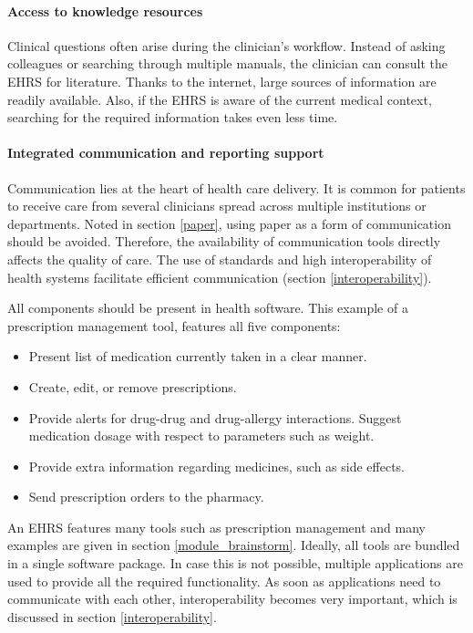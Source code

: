     \paragraph{Access to knowledge resources} Clinical questions often arise during the clinician's workflow. Instead of asking colleagues or searching through multiple manuals, the clinician can consult the EHRS for literature. Thanks to the internet, large sources of information are readily available. Also, if the EHRS is aware of the current medical context, searching for the required information takes even less time. 

    \paragraph{Integrated communication and reporting support} Communication lies at the heart of health care delivery. It is common for patients to receive care from several clinicians spread across multiple institutions or departments. Noted in section \ref{paper}, using paper as a form of communication should be avoided. Therefore, the availability of communication tools directly affects the quality of care. The use of standards and high interoperability of health systems facilitate efficient communication (section \ref{interoperability}).\bigskip %

    \noindent All components should be present in health software. This example of a prescription management tool, features all five components:
    \begin{itemize}
        \item Present list of medication currently taken in a clear manner.
        \item Create, edit, or remove prescriptions.
        \item Provide alerts for drug-drug and drug-allergy interactions. Suggest medication dosage with respect to parameters such as weight.
        \item Provide extra information regarding medicines, such as side effects.
        \item Send prescription orders to the pharmacy.
    \end{itemize}

    \noindent An EHRS features many tools such as prescription management and many examples are given in section \ref{module_brainstorm}. Ideally, all tools are bundled in a single software package. In case this is not possible, multiple applications are used to provide all the required functionality. As soon as applications need to communicate with each other, interoperability becomes very important, which is discussed in section \ref{interoperability}. %

